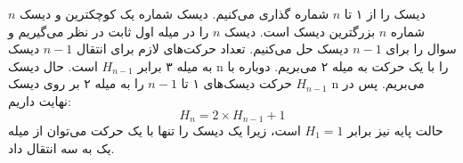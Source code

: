 \p
    $n$ 
    دیسک را از ۱ تا 
    $n$ 
    شماره گذاری می‌کنیم. دیسک شماره یک کوچکترین و دیسک شماره
    $n$  
    بزرگترین دیسک است.
    دیسک 
    $n$
    را در میله اول ثابت در نظر می‌گیریم و سوال را برای
    $n-1$
    دیسک
    حل می‌کنیم. تعداد حرکت‌های لازم برای انتقال
    $n-1$
    دیسک به میله ۳ برابر
    ${H_{n-1}}$
    است.
    حال دیسک 
    n
    را با یک حرکت به میله ۲ می‌بریم.
    دوباره با 
    ${H_{n-1}}$
    حرکت دیسک‌های ۱ تا
    $n-1$
    را به میله ۲ بر روی دیسک 
    n
    می‌بریم.
    پس در نهایت داریم:
    $$H_n = 2 \times H_{n-1} + 1 $$
    حالت پایه نیز برابر 
    $H_1 = 1$
    است،
     زیرا یک دیسک را تنها با یک حرکت می‌توان از میله یک به سه انتقال داد.